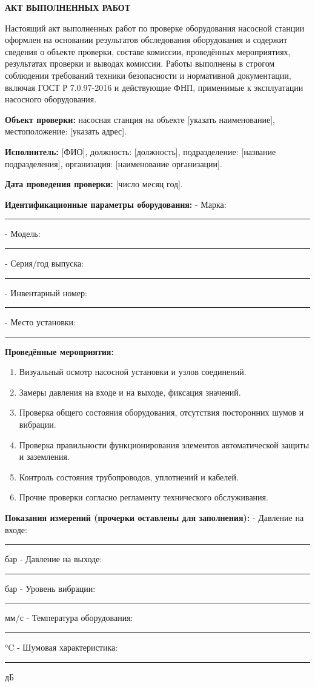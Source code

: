 \documentclass[12pt]{article}
\begin{document}
\begin{center}
\textbf{\LARGE АКТ ВЫПОЛНЕННЫХ РАБОТ}
\end{center}

\vspace{1cm}

Настоящий акт выполненных работ по проверке оборудования насосной станции оформлен на основании результатов обследования оборудования и содержит сведения о объекте проверки, составе комиссии, проведённых мероприятиях, результатах проверки и выводах комиссии. Работы выполнены в строгом соблюдении требований техники безопасности и нормативной документации, включая ГОСТ Р 7.0.97-2016 и действующие ФНП, применимые к эксплуатации насосного оборудования.

\textbf{Объект проверки:} насосная станция на объекте [указать наименование], местоположение: [указать адрес].

\textbf{Исполнитель:} [ФИО], должность: [должность], подразделение: [название подразделения], организация: [наименование организации].

\textbf{Дата проведения проверки:} [число месяц год].

\textbf{Идентификационные параметры оборудования:}
- Марка: \rule{4cm}{0.4pt}
- Модель: \rule{4cm}{0.4pt}
- Серия/год выпуска: \rule{3.5cm}{0.4pt}
- Инвентарный номер: \rule{3.5cm}{0.4pt}
- Место установки: \rule{5.5cm}{0.4pt}

\textbf{Проведённые мероприятия:}
\begin{enumerate}
  \item Визуальный осмотр насосной установки и узлов соединений.
  \item Замеры давления на входе и на выходе, фиксация значений.
  \item Проверка общего состояния оборудования, отсутствия посторонних шумов и вибрации.
  \item Проверка правильности функционирования элементов автоматической защиты и заземления.
  \item Контроль состояния трубопроводов, уплотнений и кабелей.
  \item Прочие проверки согласно регламенту технического обслуживания.
\end{enumerate}

\textbf{Показания измерений (прочерки оставлены для заполнения):}
- Давление на входе: \rule{3.5cm}{0.4pt} бар
- Давление на выходе: \rule{3.5cm}{0.4pt} бар
- Уровень вибрации: \rule{3.5cm}{0.4pt} мм/с
- Температура оборудования: \rule{3.5cm}{0.4pt} °C
- Шумовая характеристика: \rule{3.5cm}{0.4pt} дБ
\end{document}
